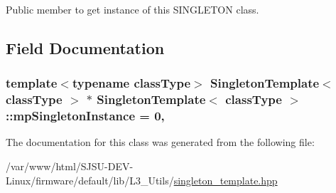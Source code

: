 Public member to get instance of this S\+I\+N\+G\+L\+E\+T\+ON class. 



\subsection{Field Documentation}
\subsubsection[{\texorpdfstring{mp\+Singleton\+Instance}{mpSingletonInstance}}]{\setlength{\rightskip}{0pt plus 5cm}template$<$typename class\+Type$>$ {\bf Singleton\+Template}$<$ class\+Type $>$ $\ast$ {\bf Singleton\+Template}$<$ class\+Type $>$\+::mp\+Singleton\+Instance = 0\hspace{0.3cm}{\ttfamily [static]}, {\ttfamily [protected]}}\hypertarget{classSingletonTemplate_ad710f0bce00d17f5a3915ddaa6c4108b}{}\label{classSingletonTemplate_ad710f0bce00d17f5a3915ddaa6c4108b}


The documentation for this class was generated from the following file\+:\begin{DoxyCompactItemize}
\item 
/var/www/html/\+S\+J\+S\+U-\/\+D\+E\+V-\/\+Linux/firmware/default/lib/\+L3\+\_\+\+Utils/\hyperlink{singleton__template_8hpp}{singleton\+\_\+template.\+hpp}\end{DoxyCompactItemize}
